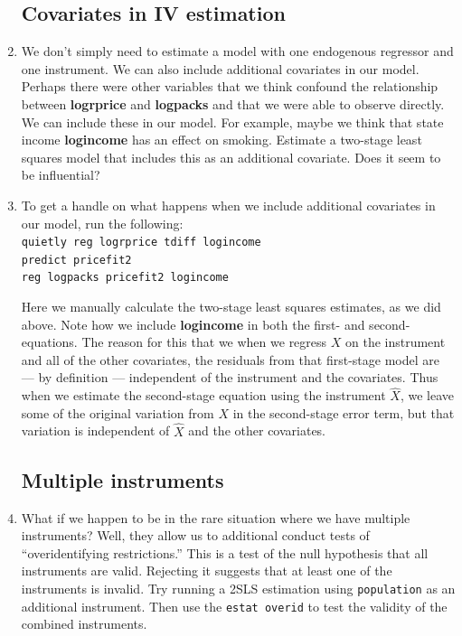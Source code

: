 \documentclass[a4paper,12pt]{article}
\begin{document}
\begin{enumerate}
\subsection*{Covariates in IV estimation}

\item We don't simply need to estimate a model with one endogenous regressor and one instrument. We can also include additional covariates in our model. Perhaps there were other variables that we think confound the relationship between \textbf{logrprice} and \textbf{logpacks} and that we were able to observe directly. We can include these in our model. For example, maybe we think that state income \textbf{logincome} has an effect on smoking. Estimate a two-stage least squares model that includes this as an additional covariate. Does it seem to be influential?

\item To get a handle on what happens when we include additional covariates in our model, run the following:\\
\texttt{quietly reg logrprice tdiff logincome\\
predict pricefit2\\
reg logpacks pricefit2 logincome}

Here we manually calculate the two-stage least squares estimates, as we did above. Note how we include \textbf{logincome} in both the first- and second-equations. The reason for this that we when we regress $X$ on the instrument and all of the other covariates, the residuals from that first-stage model are --- by definition --- independent of the instrument and the covariates. Thus when we estimate the second-stage equation using the instrument $\hat{X}$, we leave some of the original variation from $X$ in the second-stage error term, but that variation is independent of $\hat{X}$ and the other covariates.

\subsection*{Multiple instruments}

\item What if we happen to be in the rare situation where we have multiple instruments? Well, they allow us to additional conduct tests of ``overidentifying restrictions.'' This is a test of the null hypothesis that all instruments are valid. Rejecting it suggests that at least one of the instruments is invalid. Try running a 2SLS estimation using \texttt{population} as an additional instrument. Then use the \texttt{estat overid} to test the validity of the combined instruments. 


\end{enumerate}
\end{document}
